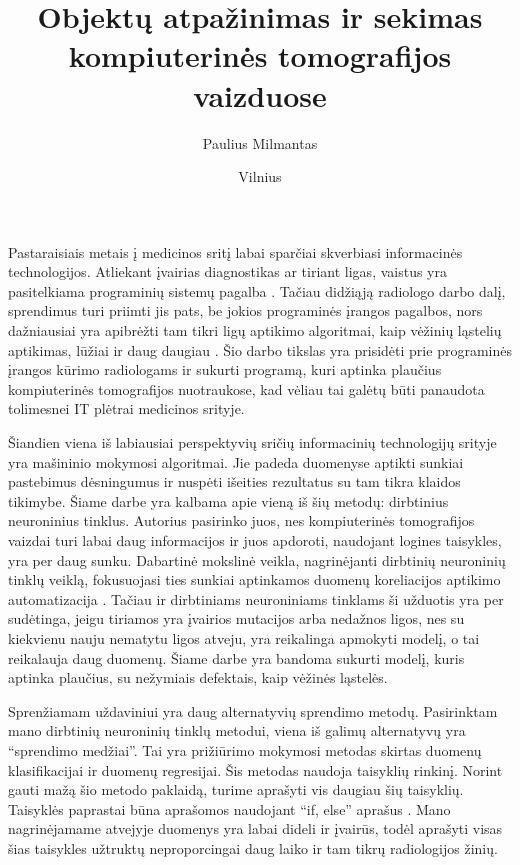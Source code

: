 \documentclass{VUMIFInfKursinis}
\title{Objektų atpažinimas ir sekimas kompiuterinės tomografijos vaizduose}
\author{Paulius Milmantas}
\date{Vilnius \\ \the\year}
\begin{document}
\maketitle

Pastaraisiais metais į medicinos sritį labai sparčiai skverbiasi informacinės technologijos. Atliekant
įvairias diagnostikas ar tiriant ligas, vaistus yra pasitelkiama programinių sistemų pagalba \cite{salt22}. Tačiau
didžiąją radiologo darbo dalį, sprendimus turi priimti jis pats, be jokios programinės įrangos pagalbos,
nors dažniausiai yra apibrėžti tam tikri ligų aptikimo algoritmai, kaip vėžinių ląstelių aptikimas,
lūžiai ir daug daugiau \cite{salt23}. Šio darbo tikslas yra prisidėti prie programinės įrangos kūrimo radiologams
ir sukurti programą, kuri aptinka plaučius kompiuterinės tomografijos
nuotraukose, kad vėliau tai galėtų būti panaudota tolimesnei
IT plėtrai medicinos srityje.
\par
Šiandien viena iš labiausiai perspektyvių sričių informacinių technologijų srityje yra mašininio mokymosi algoritmai. 
Jie padeda duomenyse aptikti sunkiai pastebimus dėsningumus ir nuspėti išeities rezultatus su tam tikra klaidos tikimybe.
Šiame darbe yra kalbama apie vieną iš šių metodų: dirbtinius neuroninius tinklus.
Autorius pasirinko juos, nes kompiuterinės tomografijos vaizdai turi labai daug informacijos ir juos apdoroti,
naudojant logines taisykles, yra per daug sunku. 
Dabartinė mokslinė veikla, nagrinėjanti dirbtinių neuroninių tinklų veiklą,
fokusuojasi ties sunkiai aptinkamos duomenų koreliacijos aptikimo
automatizacija \cite{salt24}.
Tačiau ir dirbtiniams neuroniniams tinklams ši užduotis yra per sudėtinga, jeigu
tiriamos yra įvairios mutacijos arba nedažnos ligos, nes su kiekvienu nauju nematytu ligos atveju,
yra reikalinga apmokyti modelį, o tai reikalauja daug duomenų. Šiame 
darbe yra bandoma sukurti modelį, kuris aptinka plaučius, su nežymiais defektais, kaip vėžinės ląstelės.
\par
Sprenžiamam uždaviniui yra daug alternatyvių sprendimo metodų.
Pasirinktam mano dirbtinių neuroninių tinklų metodui, viena iš galimų alternatyvų yra \enquote{sprendimo medžiai}.
Tai yra prižiūrimo mokymosi metodas skirtas duomenų klasifikacijai ir duomenų regresijai. Šis metodas
naudoja taisyklių rinkinį. Norint gauti mažą šio metodo paklaidą, turime aprašyti vis daugiau šių taisyklių.
Taisyklės paprastai būna aprašomos naudojant \enquote{if, else} aprašus \cite{salt1}. Mano nagrinėjamame atvejyje duomenys
yra labai dideli ir įvairūs, todėl aprašyti visas šias taisykles užtruktų neproporcingai daug laiko ir tam
tikrų radiologijos žinių.
\end{document}
